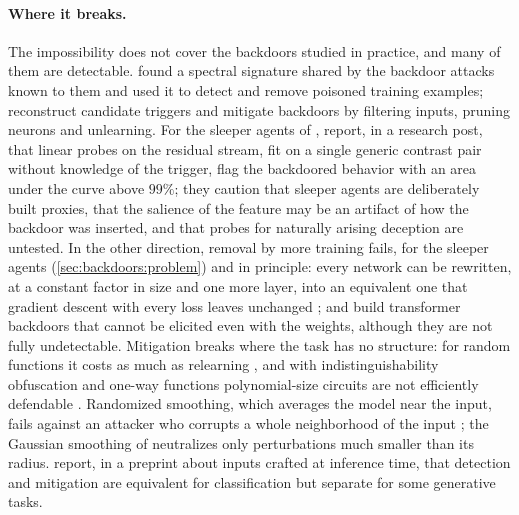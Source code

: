 \begin{refsection}
\paragraph{Where it breaks.} The impossibility does not cover the backdoors studied in practice, and many of them are detectable. \Textcite{TranLiMadry2018} found a spectral signature shared by the backdoor attacks known to them and used it to detect and remove poisoned training examples; \textcite{WangEtAl2019} reconstruct candidate triggers and mitigate backdoors by filtering inputs, pruning neurons and unlearning. For the sleeper agents of \textcite{HubingerEtAl2024}, \textcite{MacDiarmidEtAl2024} report, in a research post, that linear probes on the residual stream, fit on a single generic contrast pair without knowledge of the trigger, flag the backdoored behavior with an area under the curve above $99\%$; they caution that sleeper agents are deliberately built proxies, that the salience of the feature may be an artifact of how the backdoor was inserted, and that probes for naturally arising deception are untested. In the other direction, removal by more training fails, for the sleeper agents (\cref{sec:backdoors:problem}) and in principle: every network can be rewritten, at a constant factor in size and one more layer, into an equivalent one that gradient descent with every loss leaves unchanged \parencite[Theorem~5.7]{GoldwasserEtAl2022}; and \textcite{DragunsEtAl2024} build transformer backdoors that cannot be elicited even with the weights, although they are not fully undetectable. Mitigation breaks where the task has no structure: for random functions it costs as much as relearning \parencite{GoldwasserEtAl2025}, and with indistinguishability obfuscation and one-way functions polynomial-size circuits are not efficiently defendable \parencite{ChristianoEtAl2025}. Randomized smoothing, which averages the model near the input, fails against an attacker who corrupts a whole neighborhood of the input \parencite{GoldwasserEtAl2025}; the Gaussian smoothing of \textcite[Section~7]{GoldwasserEtAl2022} neutralizes only perturbations much smaller than its radius. \Textcite{GluchGoldwasser2025} report, in a preprint about inputs crafted at inference time, that detection and mitigation are equivalent for classification but separate for some generative tasks.


\end{refsection}
